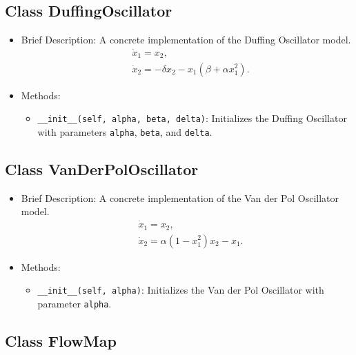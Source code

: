 \subsection{Class DuffingOscillator}

\begin{itemize}
\item Brief Description: A concrete implementation of the Duffing Oscillator model.
  \begin{align*}
    &\dot{x}_1 = x_2,\\
    &\dot{x}_2 = -\delta x_2 - x_1(\beta + \alpha x_1^2).
  \end{align*}
\item Methods:
  \begin{itemize}
  \item \lstinline|__init__(self, alpha, beta, delta)|: Initializes the Duffing Oscillator
    with parameters \lstinline|alpha|,
    \lstinline|beta|, and \lstinline|delta|.
  \end{itemize}
\end{itemize}

\subsection{Class VanDerPolOscillator}

\begin{itemize}
\item Brief Description: A concrete implementation of the Van der Pol Oscillator model.
  \begin{align*}
    &\dot{x}_1 = x_2,\\
    &\dot{x}_2 = \alpha(1 - x_1^2)x_2 - x_1.
  \end{align*}
\item Methods:
  \begin{itemize}
  \item \lstinline|__init__(self, alpha)|: Initializes the Van der Pol Oscillator with parameter \lstinline|alpha|.
  \end{itemize}
\end{itemize}

\subsection{Class FlowMap}

